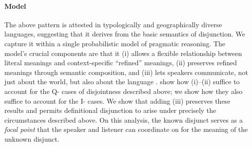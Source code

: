 \documentclass[12pt]{article}
\newcommand{\tech}[1]{\emph{#1}}
\begin{document}
\paragraph{Model} The above pattern is attested in typologically and
geographically diverse languages, suggesting that it derives from the
basic semantics of disjunction. We capture it within a single
probabilistic model of pragmatic reasoning. The model's crucial
components are that it (i) allows a flexible relationship between
literal meanings and context-specific ``refined'' meanings, (ii)
preserves refined meanings through semantic composition, and (iii)
lets speakers communicate, not just about the world, but also about
the language \citep{Smith:Goodman:Frank:2013}.
\citet{bergen-levy-goodman:2014} show how (i)--(ii) suffice to account
for the Q- cases of disjointness described above; we show how they
also suffice to account for the I- cases.  We show that adding (iii)
preserves these results and permits definitional disjunction to arise
under precisely the circumstances described above. On this analysis,
the known disjunct serves as a \tech{focal point} that the speaker and
listener can coordinate on for the meaning of the unknown disjunct.


\let\olditem\item
\renewenvironment{thebibliography}[1]{
\footnotesize
  \paragraph{References}
  \let\par\relax\let\newblock\relax
  \renewcommand{\item}[1][]{\olditem[\textbullet]}%
  \inparaenum
}{\endinparaenum}


\begin{spacing}{0.85}

\end{spacing}
\end{document}
